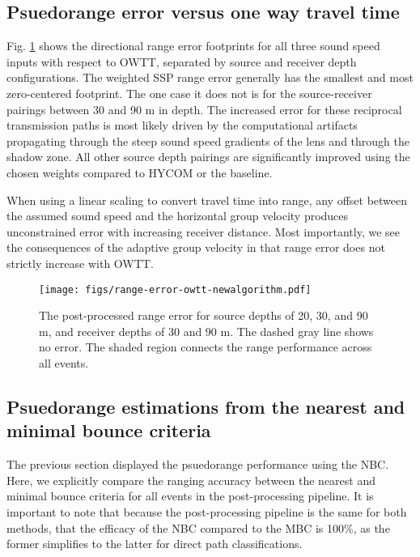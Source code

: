 \FloatBarrier
\subsection{Psuedorange error versus one way travel time}

Fig. \ref{fig:rangeError} shows the directional range error footprints for all three sound speed inputs with respect to OWTT, separated by source and receiver depth configurations.
The weighted SSP range error generally has the smallest and most zero-centered footprint.
The one case it does not is for the source-receiver pairings between 30 and 90 m in depth.
The increased error for these reciprocal transmission paths is most likely driven by the computational artifacts propagating through the steep sound speed gradients of the lens and through the shadow zone. 
All other source depth pairings are significantly improved using the chosen weights compared to HYCOM or the baseline.

When using a linear scaling to convert travel time into range, any offset between the assumed sound speed and the horizontal group velocity produces unconstrained error with increasing receiver distance.
Most importantly, we see the consequences of the adaptive group velocity in that range error does not strictly increase with OWTT.

\begin{figure}[!ht]
\texttt{[image: figs/range-error-owtt-newalgorithm.pdf]}
\caption{The post-processed range error for source depths of 20, 30, and 90 m, and receiver depths of 30 and 90 m. The dashed gray line shows no error. The shaded region connects the range performance across all events.}
\label{fig:rangeError}
\end{figure}

\FloatBarrier
\subsection{Psuedorange estimations from the nearest and minimal bounce criteria}

The previous section displayed the psuedorange performance using the NBC.
Here, we explicitly compare the ranging accuracy between the nearest and minimal bounce criteria for all events in the post-processing pipeline.
It is important to note that because the post-processing pipeline is the same for both methods, that the efficacy of the NBC compared to the MBC is 100\%, as the former simplifies to the latter for direct path classifications.

